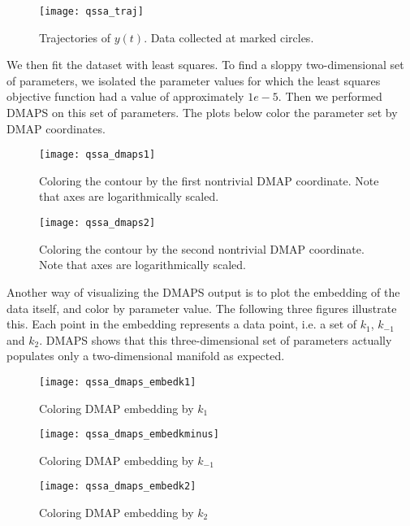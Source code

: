 \documentclass[12pt]{article}
\begin{document}
\begin{figure}[h!]
  \texttt{[image: qssa\_traj]}
  \caption{Trajectories of $y(t)$. Data collected at marked circles.}
\end{figure}

\newpage

We then fit the dataset with least squares. To find a sloppy two-dimensional set of parameters, we isolated the parameter values for which the least squares objective function had a value of approximately $1e-5$. Then we performed DMAPS on this set of parameters. The plots below color the parameter set by DMAP coordinates.

\begin{figure}[h!]
  \texttt{[image: qssa\_dmaps1]}
  \caption{Coloring the contour by the first nontrivial DMAP coordinate. Note that axes are logarithmically scaled.}
\end{figure}

\begin{figure}[h!]
  \texttt{[image: qssa\_dmaps2]}
  \caption{Coloring the contour by the second nontrivial DMAP coordinate. Note that axes are logarithmically scaled.}
\end{figure}

\newpage

Another way of visualizing the DMAPS output is to plot the embedding of the data itself, and color by parameter value. The following three figures illustrate this. Each point in the embedding represents a data point, i.e. a set of $k_1$, $k_{-1}$ and $k_2$. DMAPS shows that this three-dimensional set of parameters actually populates only a two-dimensional manifold as expected.

\begin{figure}[h!]
  \texttt{[image: qssa\_dmaps\_embedk1]}
  \caption{Coloring DMAP embedding by $k_1$}
\end{figure}

\begin{figure}[h!]
  \texttt{[image: qssa\_dmaps\_embedkminus]}
  \caption{Coloring DMAP embedding by $k_{-1}$}
\end{figure}

\begin{figure}[h!]
  \texttt{[image: qssa\_dmaps\_embedk2]}
  \caption{Coloring DMAP embedding by $k_2$}
\end{figure}
\end{document}
